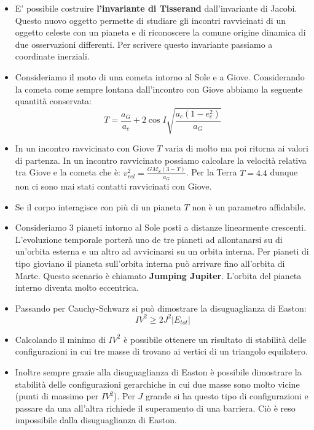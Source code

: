 \documentclass[11pt,a4paper]{article}
\begin{document}
\begin{itemize}
\item E' possibile costruire \textbf{l'invariante di Tisserand} dall'invariante di Jacobi. Questo nuovo oggetto permette di studiare gli incontri ravvicinati di un oggetto celeste con un pianeta e di riconoscere la comune origine dinamica di due osservazioni differenti. Per scrivere questo invariante passiamo a coordinate inerziali.

\item Consideriamo il moto di una cometa intorno al Sole e a Giove. Considerando la cometa come sempre lontana dall'incontro con Giove abbiamo la seguente quantità conservata:
\begin{equation}
T = \frac{a_G}{a_c} + 2 \cos I \sqrt{\frac{a_c \left( 1 - e_c^2 \right)}{a_G}}
\end{equation}

\item In un incontro ravvicinato con Giove $T$ varia di molto ma poi ritorna ai valori di partenza. In un incontro ravvicinato possiamo calcolare la velocità relativa tra Giove e la cometa che è: $v_{rel}^{2} = \frac{GM_S \left( 3 - T \right)}{a_G}$. Per la Terra $T = 4.4$ dunque non ci sono mai stati contatti ravvicinati con Giove. 

\item Se il corpo interagisce con più di un pianeta $T$ non è un parametro affidabile.

\item Consideriamo $3$ pianeti intorno al Sole posti a distanze linearmente crescenti. L'evoluzione temporale porterà uno de tre pianeti ad allontanarsi su di un'orbita esterna e un altro ad avvicinarsi su un orbita interna. Per pianeti di tipo gioviano il pianeta sull'orbita interna può arrivare fino all'orbita di Marte. Questo scenario è chiamato \textbf{Jumping Jupiter}. L'orbita del pianeta interno diventa molto eccentrica.

\item Passando per Cauchy-Schwarz si può dimostrare la disuguaglianza di Easton:
\begin{equation}
I V^2 \ge 2 J^2 |E_{tot}|
\end{equation}

\item Calcolando il minimo di $IV^2$ è possibile ottenere un risultato di stabilità delle configurazioni in cui tre masse di trovano ai vertici di un triangolo equilatero.

\item Inoltre sempre grazie alla disuguaglianza di Easton è possibile dimostrare la stabilità delle configurazioni gerarchiche in cui due masse sono molto vicine (punti di massimo per $IV^2$). Per $J$ grande si ha questo tipo di configurazioni e passare da una all'altra richiede il superamento di una barriera. Ciò è reso impossibile dalla disuguaglianza di Easton.


\end{itemize}
\end{document}
